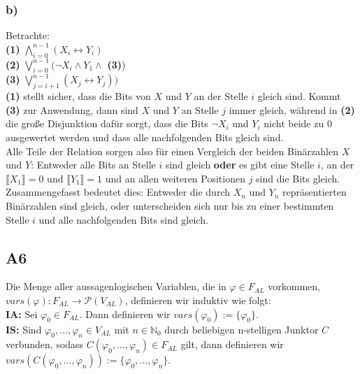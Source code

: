\documentclass[12pt, a4paper]{article}
\newcommand*{\puffer}{\text{ }\text{ }\text{ }\text{ }}
\newcommand{\lb}{\llbracket}
\newcommand{\rb}{\rrbracket}
\begin{document}
\subsubsection*{b)}
Betrachte: \\
\textbf{(1)} \puffer \(\bigwedge_{i=0}^{n-1} (X_i \leftrightarrow Y_i)\)\\
\textbf{(2)} \puffer \(\bigvee_{i=0}^{n-1} ( \lnot X_i \wedge Y_1 \wedge\) \textbf{(3)})\\
\textbf{(3)} \puffer \(\bigvee_{j=i+1}^{n-1}(X_j \leftrightarrow Y_j))\)\\
\textbf{(1)} stellt sicher, dass die Bits von \(X\) und \(Y\) an der Stelle \(i\) gleich sind.
Kommt \textbf{(3)} zur Anwendung, dann sind \(X\) und \(Y\) an Stelle \(j\) immer gleich, während 
in \textbf{(2)} die große Disjunktion dafür sorgt, dass die Bits \(\lnot X_i\) und \(Y_i\) nicht beide zu 0 
ausgewertet werden und dass alle nachfolgenden Bits gleich sind.\\
Alle Teile der Relation sorgen also für einen Vergleich der beiden Binärzahlen \(X\) und \(Y\): Entweder 
alle Bits an Stelle \(i\) sind gleich \textbf{oder} es gibt eine Stelle \(i\), an der \(\lb X_1 \rb = 0\) und 
\(\lb Y_1 \rb = 1\) und an allen weiteren Positionen \(j\) sind die Bits gleich. \\
Zusammengefasst bedeutet dies: Entweder die durch \(X_n\) und \(Y_n\) repräsentierten Binärzahlen sind gleich, 
oder unterscheiden sich nur bis zu einer bestimmten Stelle \(i\) und alle nachfolgenden Bits sind gleich.\\

\subsection*{A6}
Die Menge aller aussagenlogischen Variablen, die in \(\varphi \in F_{AL}\) vorkommen, \(vars(\varphi) : 
F_{AL} \rightarrow \mathcal{P}(V_{AL})\), definieren wir induktiv wie folgt: \\
\textbf{IA:} \puffer Sei \(\varphi_0 \in F_{AL}\). Dann definieren wir \(vars(\varphi_0) := \{\varphi_0\}\).\\
\textbf{IS:} \puffer Sind \(\varphi_0, \dots, \varphi_n \in V_{AL}\) mit \(n \in \mathbb{N}_0\) durch 
beliebigen n-stelligen Junktor \(C\) verbunden, sodass \(C(\varphi_0, \dots, \varphi_n) \in F_{AL}\) gilt, 
dann definieren wir \(vars(C(\varphi_0, \dots, \varphi_n)) := \{\varphi_0, \dots, \varphi_n\}\).
\end{document}
